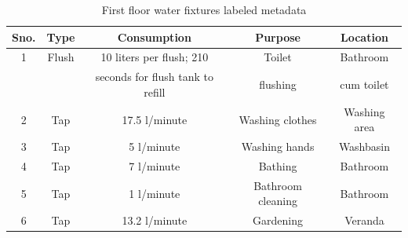 \documentclass[10pt]{sensys-proc}
\begin{document}
\begin{table}
\tabcolsep=0.015cm
\vspace{-4mm}
\caption{First floor water fixtures labeled metadata}
\vspace{-4mm}
\label{tab:water_consumption_labeled}
\footnotesize
\begin{tabular}{|c|c|c|c|c|}
\hline
\textbf{Sno.}&\textbf{Type}&\textbf{Consumption}&\textbf{Purpose}&\textbf{Location}\\
\hline
1&Flush&10 liters per flush; 210&Toilet&Bathroom\\
 &&seconds for flush tank to refill&flushing&cum toilet\\ \hline
2&Tap&17.5 l/minute&Washing clothes&Washing area\\ \hline
3&Tap&5 l/minute&Washing hands&Washbasin\\ \hline
4&Tap&7 l/minute&Bathing&Bathroom\\ \hline
5&Tap&1 l/minute&Bathroom cleaning&Bathroom\\ \hline
6&Tap&13.2 l/minute&Gardening&Veranda\\ \hline

\end{tabular}
\end{table}
\end{document}
